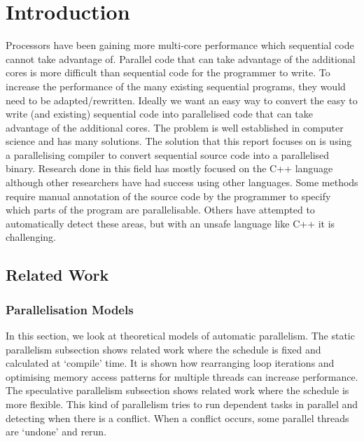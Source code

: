 \chapter{Introduction}
Processors have been gaining more multi-core performance which sequential code cannot take advantage of. Parallel code that can take advantage of the additional cores is more difficult than sequential code for the programmer to write. To increase the performance of the many existing sequential programs, they would need to be adapted/rewritten. Ideally we want an easy way to convert the easy to write (and existing) sequential code into parallelised code that can take advantage of the additional cores.
The problem is well established in computer science and has many solutions. The solution that this report focuses on is using a parallelising compiler to convert sequential source code into a parallelised binary. Research done in this field has mostly focused on the C++ language although other researchers have had success using other languages. Some methods require manual annotation of the source code by the programmer to specify which parts of the program are parallelisable. Others have attempted to automatically detect these areas, but with an unsafe language like C++ it is challenging.

\section{Related Work}
\label{sec:related-work}

\subsection{Parallelisation Models}
\label{sec:related-models}
In this section, we look at theoretical models of automatic parallelism. The static parallelism subsection shows related work where the schedule is fixed and calculated at `compile' time. It is shown how rearranging loop iterations and optimising memory access patterns for multiple threads can increase performance. The speculative parallelism subsection shows related work where the schedule is more flexible. This kind of parallelism tries to run dependent tasks in parallel and detecting when there is a conflict. When a conflict occurs, some parallel threads are `undone' and rerun.

